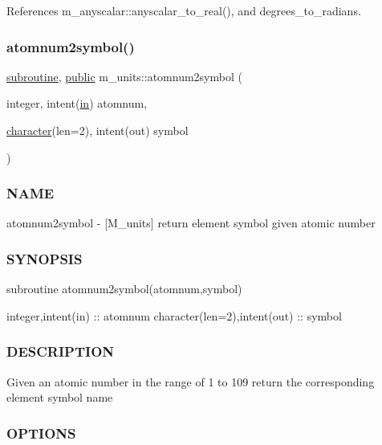 References m\+\_\+anyscalar\+::anyscalar\+\_\+to\+\_\+real(), and degrees\+\_\+to\+\_\+radians.

\mbox{\label{namespacem__units_a09d8d6552dedf64faf635ea0ea6606ab}} 
\subsubsection{\texorpdfstring{atomnum2symbol()}{atomnum2symbol()}}
{\footnotesize\ttfamily \hyperlink{M__stopwatch_83_8txt_acfbcff50169d691ff02d4a123ed70482}{subroutine}, \hyperlink{M__stopwatch_83_8txt_a2f74811300c361e53b430611a7d1769f}{public} m\+\_\+units\+::atomnum2symbol (\begin{DoxyParamCaption}\item[{integer, intent(\hyperlink{M__journal_83_8txt_afce72651d1eed785a2132bee863b2f38}{in})}]{atomnum,  }\item[{\hyperlink{option__stopwatch_83_8txt_abd4b21fbbd175834027b5224bfe97e66}{character}(len=2), intent(out)}]{symbol }\end{DoxyParamCaption})}



\subsubsection*{N\+A\+ME}

atomnum2symbol -\/ \mbox{[}M\+\_\+units\mbox{]} return element symbol given atomic number \subsubsection*{S\+Y\+N\+O\+P\+S\+IS}

subroutine atomnum2symbol(atomnum,symbol)

integer,intent(in) \+:\+: atomnum character(len=2),intent(out) \+:\+: symbol

\subsubsection*{D\+E\+S\+C\+R\+I\+P\+T\+I\+ON}

Given an atomic number in the range of 1 to 109 return the corresponding element symbol name

\subsubsection*{O\+P\+T\+I\+O\+NS}

